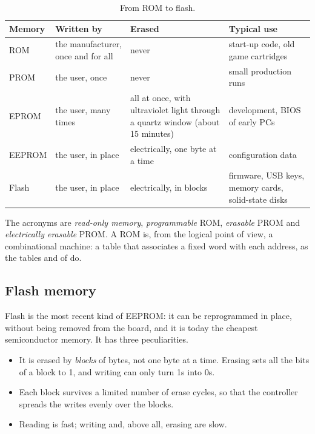 \begin{table}[htb]
\centering\small
\caption{From ROM to flash.}\label{tab:st:rom}
\begin{tabularx}{\textwidth}{@{}lP{0.24\textwidth}LL@{}}
\toprule
\textbf{Memory} & \textbf{Written by} & \textbf{Erased} & \textbf{Typical use}\\
\midrule
ROM & the manufacturer, once and for all & never & start-up code, old game cartridges\\
PROM & the user, once & never & small production runs\\
EPROM & the user, many times & all at once, with ultraviolet light through a quartz window (about 15 minutes) & development, BIOS of early PCs\\
EEPROM & the user, in place & electrically, one byte at a time & configuration data\\
Flash & the user, in place & electrically, in blocks & firmware, USB keys, memory cards, solid-state disks\\
\bottomrule
\end{tabularx}
\end{table}

The acronyms are \emph{read-only memory}, \emph{programmable} ROM,
\emph{erasable} PROM and \emph{electrically erasable} PROM. A ROM is, from
the logical point of view, a combinational machine: a table that associates a
fixed word with each address, as the tables  and  of
\vermone do.

\subsection{Flash memory}

Flash is the most recent kind of EEPROM: it can be reprogrammed in place,
without being removed from the board, and it is today the cheapest
semiconductor memory. It has three peculiarities.

\begin{itemize}
\item It is erased by \emph{blocks} of bytes, not one byte at a time. Erasing
  sets all the bits of a block to 1, and writing can only turn 1s into 0s.
\item Each block survives a limited number of erase cycles, so that the
  controller spreads the writes evenly over the blocks.
\item Reading is fast; writing and, above all, erasing are slow.
\end{itemize}

